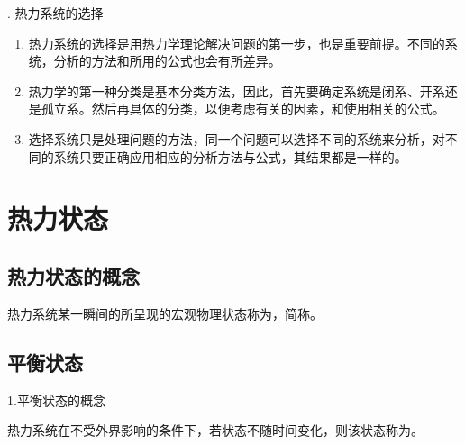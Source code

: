 . 热力系统的选择
\begin{enumerate}[\hspace*{1em}(1) ]
	\item 热力系统的选择是用热力学理论解决问题的第一步，也是重要前提。不同的系统，分析的方法和所用的公式也会有所差异。
	\item 热力学的第一种分类是基本分类方法，因此，首先要确定系统是闭系、开系还是孤立系。然后再具体的分类，以便考虑有关的因素，和使用相关的公式。
	\item 选择系统只是处理问题的方法，同一个问题可以选择不同的系统来分析，对不同的系统只要正确应用相应的分析方法与公式，其结果都是一样的。
\end{enumerate}


\section{热力状态}
\subsection{热力状态的概念}
\tdefination[热力状态]
热力系统某一瞬间的所呈现的宏观物理状态称为，简称。\\

\subsection{平衡状态}
\noindent 1.平衡状态的概念

热力系统在不受外界影响的条件下，若状态不随时间变化，则该状态称为。

